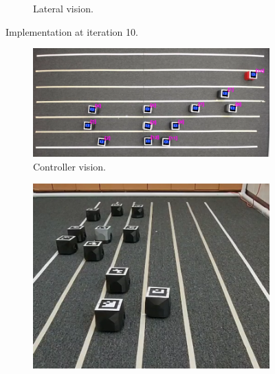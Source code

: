 \begin{appendix}
\begin{figure}[H]
\begin{subfigure}[b]{0.50\textwidth}
    \caption{Lateral vision.}
    \label{fig:third}
\end{subfigure}
\caption{Implementation at iteration 10.}
\label{fig:figures}
\end{figure}





\begin{figure}[H]
\centering
\begin{subfigure}[t]{\textwidth}
    \includegraphics[width=\textwidth]{Anexos/no_restricted/no_res_it30_cam0.png}
    \caption{Controller vision.}
    \label{fig:first}
\end{subfigure}
\vspace{1cm}
\begin{subfigure}[b]{0.4\textwidth}
    \includegraphics[width=\textwidth]{Anexos/no_restricted/no_res_it30_cam1.png}

\end{subfigure}
\end{figure}
\end{appendix}
